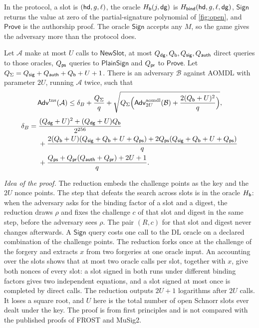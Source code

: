 In the protocol, a slot is $(\mathsf{hd}, g, \ell)$, the oracle $H_{\mathsf{b}}(j, \mathsf{dg})$ is $H_{\mathsf{bind}}(\mathsf{hd}, g, \ell, \mathsf{dg})$, $\mathsf{Sign}$ returns the value at zero of the partial-signature polynomial of \cref{fig:open}, and $\mathsf{Prove}$ is the authorship proof. The oracle $\mathsf{Sign}$ accepts any $M$, so the game gives the adversary more than the protocol does.

\begin{theorem}\label{thm:tns}
Let $\mathcal{A}$ make at most $U$ calls to $\mathsf{NewSlot}$, at most $Q_{\mathsf{dg}}, Q_{\mathsf{b}}, Q_{\mathsf{sig}}, Q_{\mathsf{auth}}$ direct queries to those oracles, $Q_{\mathsf{ps}}$ queries to $\mathsf{PlainSign}$ and $Q_{\mathsf{pr}}$ to $\mathsf{Prove}$. Let $Q_{\Sigma} = Q_{\mathsf{sig}} + Q_{\mathsf{auth}} + Q_{\mathsf{b}} + U + 1$. There is an adversary $\mathcal{B}$ against AOMDL with parameter $2U$, running $\mathcal{A}$ twice, such that
\[
  \mathsf{Adv}^{\mathrm{tns}}(\mathcal{A}) \le \delta_B + \frac{Q_{\Sigma}}{q} + \sqrt{Q_{\Sigma}\Bigl(\mathsf{Adv}^{\mathrm{aomdl}}_{2U}(\mathcal{B}) + \frac{2(Q_{\mathsf{b}} + U)^2}{q}\Bigr)} ,
\]
\begin{align*}
  \delta_B ={}& \frac{(Q_{\mathsf{dg}} + U)^2 + (Q_{\mathsf{dg}} + U)Q_{\mathsf{b}}}{2^{256}} \\
  &+ \frac{2(Q_{\mathsf{b}} + U)(Q_{\mathsf{sig}} + Q_{\mathsf{b}} + U + Q_{\mathsf{ps}}) + 2Q_{\mathsf{ps}}(Q_{\mathsf{sig}} + Q_{\mathsf{b}} + U + Q_{\mathsf{ps}})}{q} \\
  &+ \frac{Q_{\mathsf{ps}} + Q_{\mathsf{pr}}(Q_{\mathsf{auth}} + Q_{\mathsf{pr}}) + 2U + 1}{q} .
\end{align*}
\end{theorem}

\emph{Idea of the proof.} The reduction embeds the challenge points as the key and the $2U$ nonce points. The step that defeats the search across slots is in the oracle $H_{\mathsf{b}}$: when the adversary asks for the binding factor of a slot and a digest, the reduction draws $\rho$ and fixes the challenge $c$ of that slot and digest in the same step, before the adversary sees $\rho$. The pair $(R, c)$ for that slot and digest never changes afterwards. A $\mathsf{Sign}$ query costs one call to the $\mathrm{DL}$ oracle on a declared combination of the challenge points. The reduction forks once at the challenge of the forgery and extracts $x$ from two forgeries at one oracle input. An accounting over the slots shows that at most two oracle calls per slot, together with $x$, give both nonces of every slot: a slot signed in both runs under different binding factors gives two independent equations, and a slot signed at most once is completed by direct calls. The reduction outputs $2U + 1$ logarithms after $2U$ calls. It loses a square root, and $U$ here is the total number of open Schnorr slots ever dealt under the key. The proof is from first principles and is not compared with the published proofs of FROST and MuSig2.

